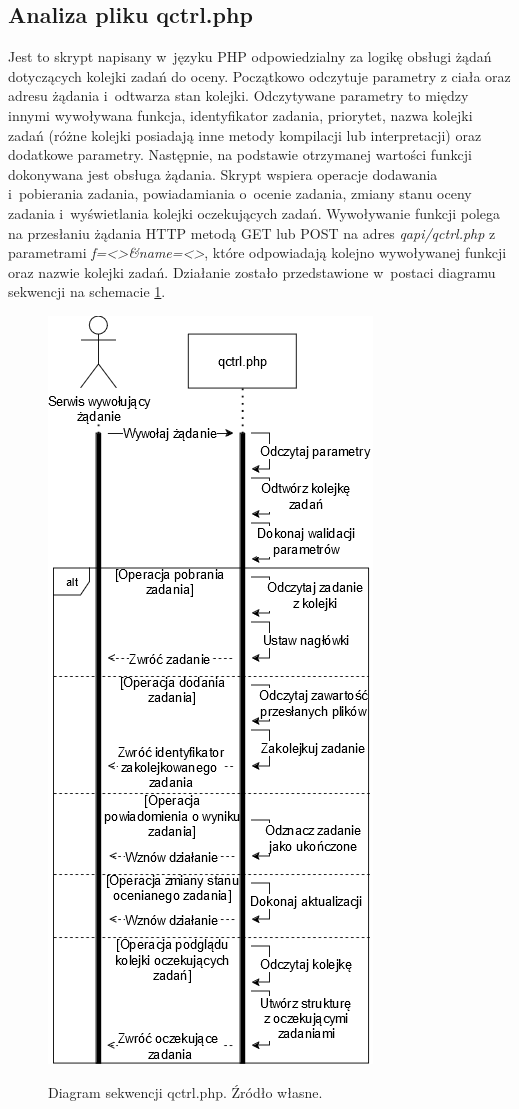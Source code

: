 \subsection{Analiza pliku qctrl.php}
Jest to skrypt napisany w~języku PHP odpowiedzialny za logikę obsługi żądań dotyczących kolejki zadań do oceny. Początkowo odczytuje parametry z ciała oraz adresu żądania i~odtwarza stan kolejki. Odczytywane parametry to między innymi wywoływana funkcja, identyfikator zadania, priorytet, nazwa kolejki zadań (różne kolejki posiadają inne metody kompilacji lub interpretacji) oraz dodatkowe parametry. Następnie, na podstawie otrzymanej wartości funkcji dokonywana jest obsługa żądania. Skrypt wspiera operacje dodawania i~pobierania zadania, powiadamiania o~ocenie zadania, zmiany stanu oceny zadania i~wyświetlania kolejki oczekujących zadań. Wywoływanie funkcji polega na przesłaniu żądania HTTP metodą GET lub POST na adres \textit{qapi/qctrl.php} z parametrami \textit{f=<>\&name=<>}, które odpowiadają kolejno wywoływanej funkcji oraz nazwie kolejki zadań. Działanie zostało przedstawione w~postaci diagramu sekwencji na schemacie \ref{qctrl}.
\begin{figure}[!h]
	\begin{center}
		\resizebox{0.6\textwidth}{!} {
			\includegraphics{img/2/qctrl.png}
		}
		\caption[Diagram sekwencji qctrl.php]{Diagram sekwencji qctrl.php. Źródło własne.}
		\label{qctrl}
	\end{center}
\end{figure}

